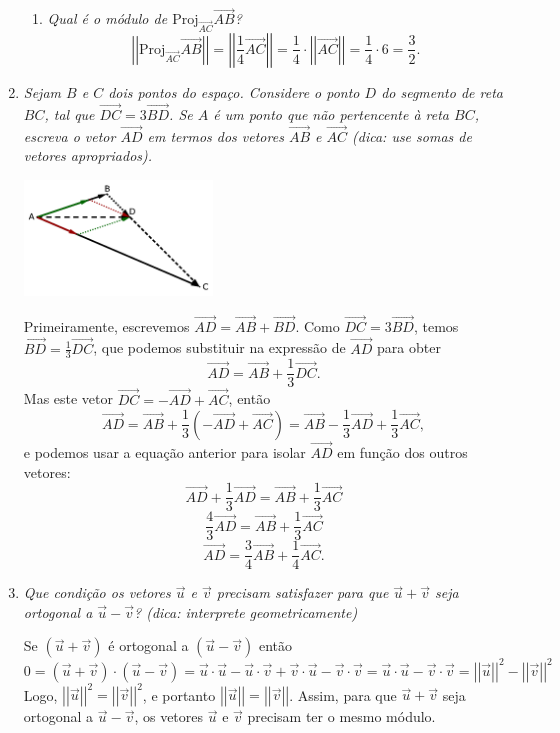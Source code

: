 \documentclass[12pt,a4paper]{article}
\newcommand{\vect}[1]{\overrightarrow{#1}}
\newcommand{\norm}[1]{\left|\left|{#1}\right|\right|}
\begin{document}
\begin{enumerate}
\begin{enumerate}
\item \textit{Qual é o módulo de $\text{Proj}_{\vect{AC}}\vect{AB}$?}
\[
 \norm{\text{Proj}_{\vect{AC}}\vect{AB}}
= \norm{\frac{1}{4}\vect{AC}}
= \frac{1}{4} \cdot \norm{\vect{AC}}
= \frac{1}{4} \cdot 6
= \frac{3}{2}.
\]
\end{enumerate}
\item \textit{Sejam $B$ e $C$ dois pontos do espaço. Considere o ponto $D$ do segmento de reta $BC$, tal que $\vect{DC} = 3 \vect{BD}$. Se $A$ é um ponto que não pertencente à reta $BC$, escreva o vetor $\vect{AD}$ em termos dos vetores $\vect{AB}$ e $\vect{AC}$ (dica: use somas de vetores apropriados).}

\includegraphics[width=5.0cm]{img/prova-1-civ-fig1b}

Primeiramente, escrevemos $\vect{AD} = \vect{AB} + \vect{BD}$. Como $\vect{DC} = 3 \vect{BD}$, temos $\vect{BD} = \frac{1}{3} \vect{DC}$, que podemos substituir na expressão de $\vect{AD}$ para obter
\[
\vect{AD} = \vect{AB} + \frac{1}{3} \vect{DC}.
\]
Mas este vetor $\vect{DC} = -\vect{AD} + \vect{AC}$, então
\[
\vect{AD} = \vect{AB} + \frac{1}{3} (-\vect{AD} + \vect{AC})
          = \vect{AB} - \frac{1}{3} \vect{AD} + \frac{1}{3} \vect{AC},
\]
e podemos usar a equação anterior para isolar $\vect{AD}$ em função dos outros vetores:
\[
\vect{AD} + \frac{1}{3} \vect{AD} = \vect{AB} + \frac{1}{3} \vect{AC}
\]
\[
\frac{4}{3} \vect{AD} = \vect{AB} + \frac{1}{3} \vect{AC}
\]
\[
\vect{AD} = \frac{3}{4} \vect{AB} + \frac{1}{4} \vect{AC}.
\]

\item \textit{Que condição os vetores $\vec{u}$ e $\vec{v}$ precisam satisfazer para que $\vec{u} + \vec{v}$ seja ortogonal a $\vec{u} - \vec{v}$? (dica: interprete geometricamente)}

Se $(\vec{u} + \vec{v})$ é ortogonal a $(\vec{u} - \vec{v})$ então
\[
0
= (\vec{u} + \vec{v}) \cdot (\vec{u} - \vec{v})
= \vec{u} \cdot \vec{u}
- \vec{u} \cdot \vec{v}
+ \vec{v} \cdot \vec{u}
- \vec{v} \cdot \vec{v}
=
  \vec{u} \cdot \vec{u}
- \vec{v} \cdot \vec{v}
=
  \norm{\vec{u}}^2
- \norm{\vec{v}}^2
\]
Logo, $\norm{\vec{u}}^2 = \norm{\vec{v}}^2$, e portanto $\norm{\vec{u}} = \norm{\vec{v}}$. Assim, para que $\vec{u} + \vec{v}$ seja ortogonal a $\vec{u} - \vec{v}$, os vetores $\vec{u}$ e $\vec{v}$ precisam ter o mesmo módulo.


\end{enumerate}
\end{document}
